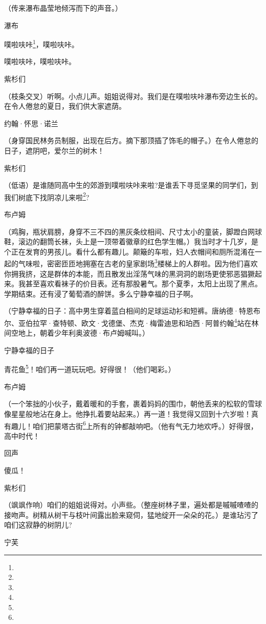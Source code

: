 \par （传来瀑布晶莹地倾泻而下的声音。）
\par 瀑布
\par 噗啦呋咔\footnote{}，噗啦呋咔。
\par 噗啦呋咔，噗啦呋咔。
\par 紫杉们
\par （枝条交叉）听啊。小点儿声。姐姐说得对。我们是在噗啦呋咔瀑布旁边生长的。在令人倦怠的夏日，我们供大家遮荫。
\par 约翰·怀思·诺兰
\par （身穿国民林务员制服，出现在后方。摘下那顶插了饰毛的帽子。）在令人倦怠的日子，遮阴吧，爱尔兰的树木！
\par 紫杉们
\par （低语）是谁随同高中生的郊游到噗啦呋咔来啦?是谁丢下寻觅坚果的同学们，到我们树底下找阴凉儿来啦\footnote{}?
\par 布卢姆
\par （鸡胸，瓶状肩膀，身穿不三不四的黑灰条纹相间、尺寸太小的童装，脚蹬白网球鞋，滚边的翻筒长袜，头上是一顶带着徽章的红色学生帽。）我当时才十几岁，是个正在发育的男孩儿。看什么都有趣儿。颠簸的车啦，妇人衣帽间和厕所混淆在一起的气味啦，密密匝匝地拥塞在古老的皇家剧场\footnote{}楼梯上的人群啦。因为他们喜欢你拥我挤，这是群体的本能，而且散发出淫荡气味的黑洞洞的剧场更使邪恶猖獗起来。我甚至喜欢看袜子的价目表。还有那股暑气。那个夏季，太阳上出现了黑点。学期结束。还有浸了葡萄酒的醉饼。多么宁静幸福的日子啊。
\par （宁静幸福的日子：高中男生穿着蓝白相间的足球运动衫和短裤。唐纳德·特恩布尔、亚伯拉罕·查特顿、欧文·戈德堡、杰克·梅雷迪思和珀西·阿普约翰\footnote{}站在林间空地上，朝着少年利奥波德·布卢姆喊叫。）
\par 宁静幸福的日子
\par 青花鱼\footnote{}！咱们再一道玩玩吧。好得很！（他们喝彩。）
\par 布卢姆
\par （一个笨拙的小伙子，戴着暖和的手套，裹着妈妈的围巾，朝他丢来的松软的雪球像星星般地沾在身上。他挣扎着要站起来。）再一道！我觉得又回到十六岁啦！真有趣儿！咱们把蒙塔古街\footnote{}上所有的钟都敲响吧。（他有气无力地欢呼。）好得很，高中时代！
\par 回声
\par 傻瓜！
\par 紫杉们
\par （飒飒作响）咱们的姐姐说得对。小声些。（整座树林子里，遍处都是嘁嘁喳喳的接吻声。树精从树干与枝叶间露出脸来窥伺，猛地绽开一朵朵的花。）是谁玷污了咱们这寂静的树阴儿?
\par 宁芙
